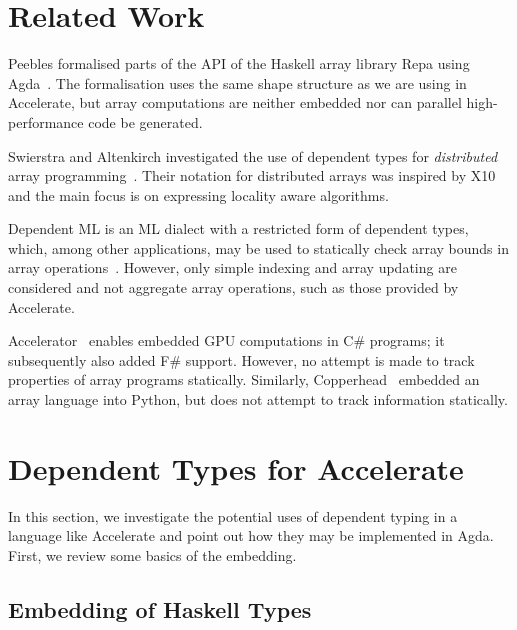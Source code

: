\documentclass{llncs}
\begin{document}
\section{Related Work}
\label{sec:related-work}

Peebles formalised parts of the API of the Haskell array library Repa using Agda~\cite{peebles:derpa}. The formalisation uses the same shape structure as we are using in Accelerate, but array computations are neither embedded nor can parallel high-performance code be generated.

Swierstra and Altenkirch investigated the use of dependent types for \emph{distributed} array programming~\cite{swierstra-altenkirch:dep-types-for-distr-arrays,swierstra:more-dependent-types}. Their notation for distributed arrays was inspired by X10 and the main focus is on expressing locality aware algorithms.

Dependent ML is an ML dialect with a restricted form of dependent types, which, among other applications, may be used to statically check array bounds in array operations~\cite{xi:dml-jfp}. However, only simple indexing and array updating are considered and not aggregate array operations, such as those provided by Accelerate.

Accelerator~\cite{Tarditi:2006} enables embedded GPU computations in C\# programs; it subsequently also added F\# support. However, no attempt is made to track properties of array programs statically. Similarly, Copperhead~\cite{Catanzaro:EECS-2010-124} embedded an array language into Python, but does not attempt to track information statically.

\section{Dependent Types for Accelerate}
\label{sec:dependent-types}

In this section, we investigate the potential uses of dependent typing
in a language like Accelerate and point out how they may be
implemented in Agda. First, we review some basics of the
embedding. 

\subsection{Embedding of Haskell Types}
\label{sec:embedding-types}
\end{document}
